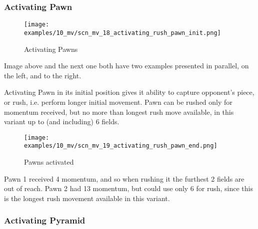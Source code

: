 \subsubsection*{Activating Pawn}

\vspace*{-1.4\baselineskip}
\noindent
\begin{figure}[!h]
\texttt{[image: examples/10\_mv/scn\_mv\_18\_activating\_rush\_pawn\_init.png]}
\vspace*{-1.3\baselineskip}
\caption{Activating Pawns}
\label{fig:scn_mv_18_activating_rush_pawn_init}
\end{figure}

\vspace*{-0.3\baselineskip}
Image above and the next one both have two examples presented in parallel, on the left,
and to the right.

Activating Pawn in its initial position gives it ability to capture opponent's
piece, or rush, i.e. perform longer initial movement. Pawn can be rushed only for
momentum received, but no more than longest rush move available, in this variant
up to (and including) 6 fields.

\clearpage %

\vspace*{-2.1\baselineskip}
\noindent
\begin{figure}[!h]
\texttt{[image: examples/10\_mv/scn\_mv\_19\_activating\_rush\_pawn\_end.png]}
\caption{Pawns activated}
\label{fig:scn_mv_19_activating_rush_pawn_end}
\end{figure}

Pawn 1 received 4 momentum, and so when rushing it the furthest 2 fields are out
of reach. Pawn 2 had 13 momentum, but could use only 6 for rush, since this is the
longest rush movement available in this variant.

\clearpage %

\subsubsection*{Activating Pyramid}

